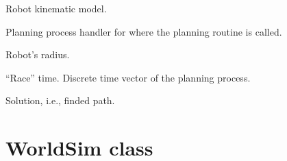 \documentclass[letterpaper,10pt,english]{sphinxmanual}
\begin{document}
\begin{fulllineitems}
\begin{fulllineitems}
\end{fulllineitems}


\begin{fulllineitems}
\label{Multi-robot motion planner:planning_sim.Robot.k_mod}
Robot kinematic model.

\end{fulllineitems}


\begin{fulllineitems}
\label{Multi-robot motion planner:planning_sim.Robot.planning_process}
Planning process handler for where the planning routine is called.

\end{fulllineitems}


\begin{fulllineitems}
\label{Multi-robot motion planner:planning_sim.Robot.rho}
Robot's radius.

\end{fulllineitems}


\begin{fulllineitems}
\label{Multi-robot motion planner:planning_sim.Robot.rtime}
``Race'' time. Discrete time vector of the planning process.

\end{fulllineitems}


\begin{fulllineitems}
\label{Multi-robot motion planner:planning_sim.Robot.sol}
Solution, i.e., finded path.

\end{fulllineitems}


\end{fulllineitems}



\section{WorldSim class}
\label{Multi-robot motion planner:worldsim-class}
\begin{DUlineblock}{0em}
\item[] 
\end{DUlineblock}
\end{document}

